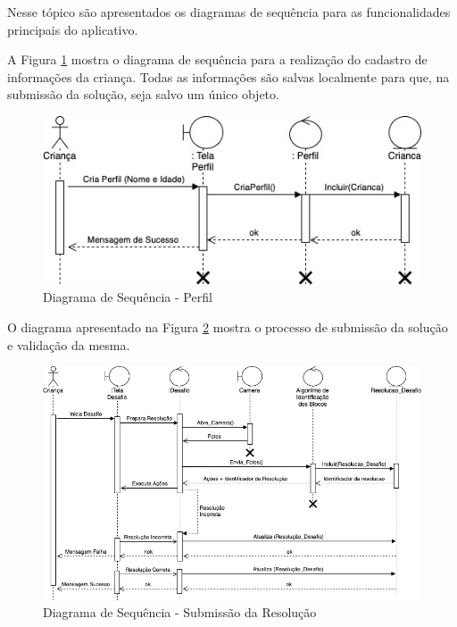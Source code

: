         Nesse tópico são apresentados os diagramas de sequência para as funcionalidades principais do aplicativo.
        
        
        A Figura \ref{figura:sequencia_perfil} mostra o diagrama de sequência para a realização do cadastro de informações da criança. Todas as informações são salvas localmente para que, na submissão da solução, seja salvo um único objeto. 
        
        \begin{figure}[H]
            \caption{Diagrama de Sequência - Perfil}
            \centering
                \includegraphics[width=\linewidth]{Imagens/Cap3/Sequencia_Perfil.jpg}
    
            \label{figura:sequencia_perfil}
        \end{figure}
        
        
        O diagrama apresentado na Figura \ref{figura:sequencia_jogo} mostra o processo de submissão da solução e validação da mesma.
        
        \begin{figure}[H]
            \caption{Diagrama de Sequência - Submissão da Resolução}
            \centering
                \includegraphics[width=\linewidth]{Imagens/Cap3/Sequencia_Jogo.jpg}
    
            \label{figura:sequencia_jogo}
        \end{figure}
        
